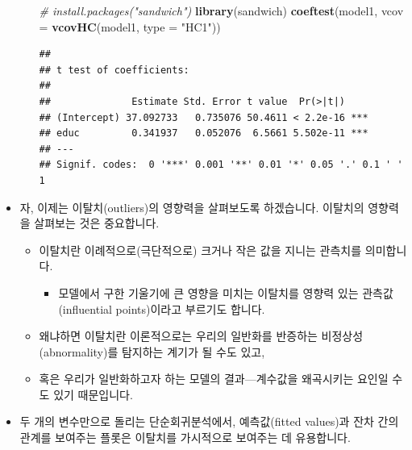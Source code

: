 \documentclass[]{book}
\newenvironment{Shaded}{\begin{snugshade}}{\end{snugshade}}
\newcommand{\CommentTok}[1]{\textcolor[rgb]{0.56,0.35,0.01}{\textit{#1}}}
\newcommand{\DataTypeTok}[1]{\textcolor[rgb]{0.13,0.29,0.53}{#1}}
\newcommand{\KeywordTok}[1]{\textcolor[rgb]{0.13,0.29,0.53}{\textbf{#1}}}
\newcommand{\NormalTok}[1]{#1}
\newcommand{\StringTok}[1]{\textcolor[rgb]{0.31,0.60,0.02}{#1}}
\providecommand{\tightlist}{%
  \setlength{\itemsep}{0pt}\setlength{\parskip}{0pt}}
\begin{document}
\begin{itemize}
\begin{itemize}
\begin{Shaded}
\begin{Highlighting}[]
\CommentTok{# install.packages("sandwich")}
\KeywordTok{library}\NormalTok{(sandwich)}
\KeywordTok{coeftest}\NormalTok{(model1, }\DataTypeTok{vcov =} \KeywordTok{vcovHC}\NormalTok{(model1, }\DataTypeTok{type =} \StringTok{"HC1"}\NormalTok{))}
\end{Highlighting}
\end{Shaded}

\begin{verbatim}
## 
## t test of coefficients:
## 
##              Estimate Std. Error t value  Pr(>|t|)    
## (Intercept) 37.092733   0.735076 50.4611 < 2.2e-16 ***
## educ         0.341937   0.052076  6.5661 5.502e-11 ***
## ---
## Signif. codes:  0 '***' 0.001 '**' 0.01 '*' 0.05 '.' 0.1 ' ' 1
\end{verbatim}
  \end{itemize}
\item
  자, 이제는 이탈치(outliers)의 영향력을 살펴보도록 하겠습니다. 이탈치의 영향력을 살펴보는 것은 중요합니다.

  \begin{itemize}
  \tightlist
  \item
    이탈치란 이례적으로(극단적으로) 크거나 작은 값을 지니는 관측치를 의미합니다.

    \begin{itemize}
    \tightlist
    \item
      모델에서 구한 기울기에 큰 영향을 미치는 이탈치를 영향력 있는 관측값(influential points)이라고 부르기도 합니다.
    \end{itemize}
  \item
    왜냐하면 이탈치란 이론적으로는 우리의 일반화를 반증하는 비정상성(abnormality)를 탐지하는 계기가 될 수도 있고,
  \item
    혹은 우리가 일반화하고자 하는 모델의 결과---계수값을 왜곡시키는 요인일 수도 있기 때문입니다.
  \end{itemize}
\item
  두 개의 변수만으로 돌리는 단순회귀분석에서, 예측값(fitted values)과 잔차 간의 관계를 보여주는 플롯은 이탈치를 가시적으로 보여주는 데 유용합니다.


\end{itemize}
\end{document}
